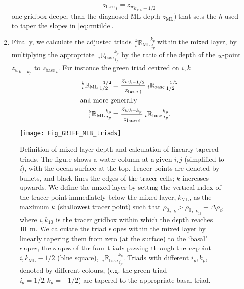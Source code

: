 \documentclass[../tex_main/NEMO_manual]{subfiles}
\begin{document}
\begin{enumerate}
\begin{equation}
  \label{eq:zbase}
  {z_\mathrm{base}}_{\,i}={z_{w}}_{k_\mathrm{ML}-1/2}
\end{equation}
one gridbox deeper than the diagnosed ML depth $z_{\mathrm{ML}})$ that sets the $h$ used to taper the slopes in
\autoref{eq:rmtilde}.
\item
  Finally, we calculate the adjusted triads ${\:}_i^k{\mathbb{R}_{\mathrm{ML}}}_{\,i_p}^{k_p}$ within
  the mixed layer, by multiplying the appropriate ${\:}_i{\mathbb{R}_{\mathrm{base}}}_{\,i_p}^{k_p}$ by
  the ratio of the depth of the $w$-point ${z_w}_{k+k_p}$ to ${z_{\mathrm{base}}}_{\,i}$.
  For instance the green triad centred on $i,k$
\begin{align}
  {\:}_i^k{\mathbb{R}_{\mathrm{ML}}}_{\,1/2}^{-1/2} &=
\frac{{z_w}_{k-1/2}}{{z_{\mathrm{base}}}_{\,i}}{\:}_i{\mathbb{R}_{\mathrm{base}}}_{\,1/2}^{-1/2}
\notag \\
\intertext{and more generally}
 {\:}_i^k{\mathbb{R}_{\mathrm{ML}}}_{\,i_p}^{k_p} &=
\frac{{z_w}_{k+k_p}}{{z_{\mathrm{base}}}_{\,i}}{\:}_i{\mathbb{R}_{\mathrm{base}}}_{\,i_p}^{k_p}.\label{eq:RML}
\end{align}
\end{enumerate}

\begin{figure}[h]
  \caption{\protect\label{fig:MLB_triad}
    Definition of mixed-layer depth and calculation of linearly tapered triads.
    The figure shows a water column at a given $i,j$ (simplified to $i$), with the ocean surface at the top.
    Tracer points are denoted by bullets, and black lines the edges of the tracer cells;
    $k$ increases upwards. \newline
    \hspace{5 em}
    We define the mixed-layer by setting the vertical index of the tracer point immediately below the mixed layer,
    $k_{\mathrm{ML}}$, as the maximum $k$ (shallowest tracer point) such that
    ${\rho_0}_{i,k}>{\rho_0}_{i,k_{10}}+\Delta\rho_c$,
    where $i,k_{10}$ is the tracer gridbox within which the depth reaches 10~m.
    We calculate the triad slopes within the mixed layer by linearly tapering them from zero
    (at the surface) to the `basal' slopes,
    the slopes of the four triads passing through the $w$-point $i,k_{\mathrm{ML}}-1/2$ (blue square),
    ${\:}_i{\mathbb{R}_{\mathrm{base}}}_{\,i_p}^{k_p}$.
    Triads with different $i_p,k_p$, denoted by different colours,
    (e.g. the green triad $i_p=1/2,k_p=-1/2$) are tapered to the appropriate basal triad.}
  {\texttt{[image: Fig\_GRIFF\_MLB\_triads]}}
\end{figure}
\end{document}
